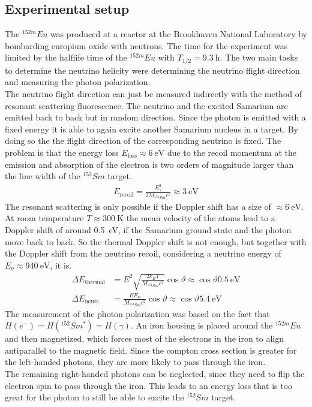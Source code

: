 \subsection{Experimental setup}
The $^{152m}Eu$ was produced at a reactor at the Brookhaven National Laboratory by bombarding europium oxide with neutrons. The time for the experiment was limited by the halflife time of the  $^{152m}Eu$ with $T_{1/2}=\SI{9.3}{\hour}$. The two main tasks to determine the neutrino helicity were determining the neutrino flight direction and measuring the photon polarization.\\
The neutrino flight direction can just be measured indirectly with the method of resonant scattering fluorescence. The neutrino and the excited Samarium are emitted back to back but in random direction. Since the photon is emitted with a fixed energy it is able to again excite another Samarium nucleus in a target. By doing so the the flight direction of the corresponding neutrino is fixed. The problem is that the energy loss $E_{\text{loss}} \approx \SI{6}{\electronvolt}$ due to the recoil momentum at the emission and absorption of the electron is two orders of magnitude larger than the line width of the $^{152}Sm$ target.
\begin{align*}
	E_{\text{recoil}} = \frac{E_{\gamma}^2}{2M_{^{152}Sm}c^2} \approx \SI{3}{\electronvolt}
\end{align*}
The resonant scattering is only possible if the Doppler shift has a size of $\approx \SI{6}{\electronvolt}$. At room temperature $T\approx \SI{300}{\kelvin}$ the mean velocity of the atoms lead to a Doppler shift of around \SI{0.5}{\electronvolt}, if the Samarium ground state and the photon move back to back. So the thermal Doppler shift is not enough, but together with the Doppler shift from the neutrino recoil, considering a neutrino energy of $E_{\nu} \approx \SI{940}{\electronvolt}$, it is.
\begin{align*}
	\Delta E_{\text{thermal}} &= E^2 \sqrt{\frac{2 k_B T}{M_{^{152}Sm} c^2}}\cos \vartheta \approx \cos \vartheta \SI{0.5}{\electronvolt} \\
	 \Delta E_{\text{neutr}} &= \frac{E E_{\nu}}{M_{^{152}Sm} c^2}\cos \vartheta \approx \cos \vartheta \SI{5.4}{\electronvolt}
\end{align*}
The measurement of the photon polarization was based on the fact that $H(e^{-})= H(^{152}Sm^*) = H(\gamma)$. An iron housing is placed around the $^{152m}Eu$ and then magnetized, which forces most of the electrons in the iron to align antiparallel to the magnetic field. Since the compton cross section is greater for the left-handed photons, they are more likely to pass through the iron.\\
The remaining right-handed photons can be neglected, since they need to flip the electron spin to pass through the iron. This leads to an energy loss that is too great for the photon to still be able to excite the $^{152}Sm$ target.

